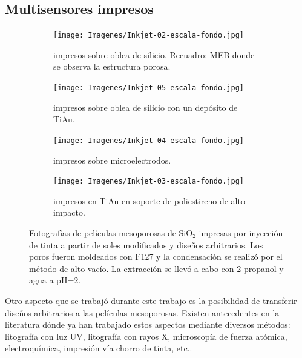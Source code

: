   \subsection{Multisensores impresos}

  			\begin{figure}[b!]
			 	   	    \centering
			 	   	    \begin{subfigure}[t]{0.495\textwidth}
			        	\texttt{[image: Imagenes/Inkjet-02-escala-fondo.jpg]}
			        	\caption{\pdmF\space impresos sobre oblea de silicio. Recuadro: MEB donde se observa la estructura porosa.}
			       		\end{subfigure}
			     		\centering
			     		\begin{subfigure}[t]{0.495\textwidth}
			     		\texttt{[image: Imagenes/Inkjet-05-escala-fondo.jpg]}
			    		\caption{\pdmF\space impresos sobre oblea de silicio con un depósito de Ti\textbar Au.}
			    		\end{subfigure}
			    		\centering
			    		\begin{subfigure}[t]{0.495\textwidth}
			         	\texttt{[image: Imagenes/Inkjet-04-escala-fondo.jpg]}
			        	\caption{\pdmF\space impresos sobre microelectrodos.}
			        	\end{subfigure}
			        	\centering
			        	\begin{subfigure}[t]{0.495\textwidth}
			     		\texttt{[image: Imagenes/Inkjet-03-escala-fondo.jpg]}
 			        	\caption{\pdmF\space impresos en Ti\textbar	Au en soporte de poliestireno de alto impacto.}
			        	\end{subfigure}
			     		\caption[Electrodos impresos]{Fotografías de películas mesoporosas de SiO$_2$ impresas por inyección de tinta a partir de soles modificados y diseños arbitrarios. Los poros fueron moldeados con F127 y la condensación se realizó por el método de alto vacío. La extracción se llevó a cabo con 2-propanol y agua a pH=2.}
			     		\label{fig:flexibles}
			     	   	\end{figure}

 	  Otro aspecto que se trabajó durante este trabajo es la posibilidad de transferir diseños arbitrarios a las películas mesoporosas. Existen antecedentes en la literatura dónde ya han trabajado estos aspectos mediante diversos métodos: litografía con luz UV, litografía con rayos X, microscopía de fuerza atómica, electroquímica, impresión vía chorro de tinta, etc.\cite{Innocenzi2008}. 

